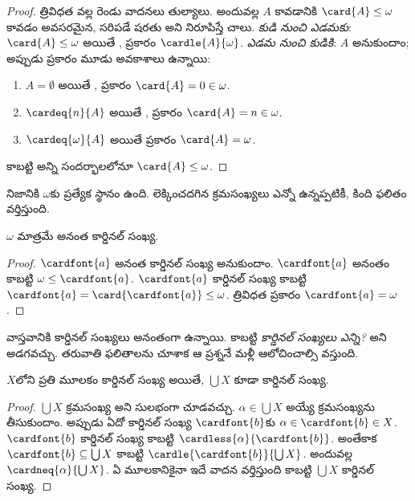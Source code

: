 \documentclass[../../../include/open-logic-section]{subfiles}
\begin{document}
\begin{proof}
త్రివిధత వల్ల రెండు వాదనలు తుల్యాలు. అందువల్ల $A$  కావడానికి $\card{A} \leq \omega$ కావడం అవసరమైన, సరిపడే షరతు అని నిరూపిస్తే చాలు. \emph{కుడి నుంచి ఎడమకు}: $\card{A} \leq \omega$ అయితే ,  ప్రకారం $\cardle{A}{\omega}$. \emph{ఎడమ నుంచి కుడికి}: $A$  అనుకుందాం; అప్పుడు  ప్రకారం మూడు అవకాశాలు ఉన్నాయి:
\begin{enumerate}
	\item $A = \emptyset$ అయితే ,  ప్రకారం $\card{A} = 0 \in \omega$.
	\item $\cardeq{n}{A}$ అయితే ,  ప్రకారం $\card{A} = n \in \omega$.
	\item $\cardeq{\omega}{A}$ అయితే  ప్రకారం $\card{A} = \omega$.
\end{enumerate}
కాబట్టి అన్ని సందర్భాలలోనూ $\card{A} \leq \omega$.
\end{proof}
\noindent
నిజానికి $\omega$కు ప్రత్యేక స్థానం ఉంది. లెక్కించదగిన క్రమసంఖ్యలు ఎన్నో ఉన్నప్పటికీ, కింది ఫలితం వర్తిస్తుంది.

\begin{cor}
$\omega$ మాత్రమే  అనంత కార్డినల్ సంఖ్య.
\end{cor}

\begin{proof}
$\cardfont{a}$  అనంత కార్డినల్ సంఖ్య అనుకుందాం. $\cardfont{a}$ అనంతం కాబట్టి $\omega \leq \cardfont{a}$. $\cardfont{a}$  కార్డినల్ సంఖ్య కాబట్టి $\cardfont{a} =
\card{\cardfont{a}} \leq \omega$. త్రివిధత ప్రకారం $\cardfont{a} = \omega$. \end{proof}

వాస్తవానికి కార్డినల్ సంఖ్యలు అనంతంగా ఉన్నాయి. కాబట్టి \emph{కార్డినల్ సంఖ్యలు ఎన్ని?} అని అడగవచ్చు. తరువాతి ఫలితాలను చూశాక ఆ ప్రశ్ననే మళ్లీ ఆలోచించాల్సి వస్తుంది.

\begin{prop}
$X$లోని ప్రతి మూలకం కార్డినల్ సంఖ్య అయితే, $\bigcup X$ కూడా కార్డినల్ సంఖ్య.
\end{prop}

\begin{proof}
$\bigcup X$ క్రమసంఖ్య అని సులభంగా చూడవచ్చు.
$\alpha \in \bigcup X$ అయ్యే క్రమసంఖ్యను తీసుకుందాం.
అప్పుడు ఏదో కార్డినల్ సంఖ్య $\cardfont{b}$కు
$\alpha \in \cardfont{b} \in X$. $\cardfont{b}$ కార్డినల్ సంఖ్య
కాబట్టి $\cardless{\alpha}{\cardfont{b}}$. అంతేకాక
$\cardfont{b} \subseteq \bigcup X$ కాబట్టి
$\cardle{\cardfont{b}}{\bigcup X}$. అందువల్ల
$\cardneq{\alpha}{\bigcup X}$. ఏ మూలకానికైనా ఇదే వాదన
వర్తిస్తుంది కాబట్టి $\bigcup X$ కార్డినల్ సంఖ్య.
\end{proof}
\end{document}

